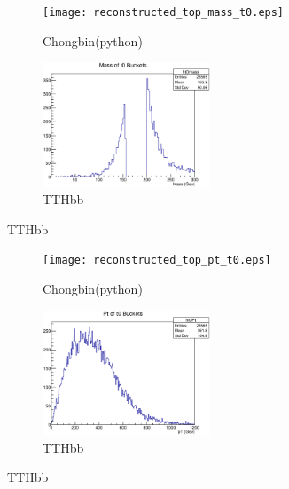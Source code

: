 \documentclass{beamer}
\begin{document}
\begin{frame}
  \begin{figure}[!h]
  \captionsetup[subfigure]{labelformat=empty}
  \begin{subfigure}{.5\textwidth}
  \centering
  \texttt{[image: reconstructed\_top\_mass\_t0.eps]}
  \caption{Chongbin(python)}
  \end{subfigure} \hfill
  \begin{subfigure}{.5\textwidth}
  \centering
  \includegraphics[width=5cm]{ht0mass_alljetregion.eps}
  \caption{TTHbb}
  \end{subfigure}
  \end{figure}
\end{frame}

\begin{frame}
  \begin{figure}[!h]
  \captionsetup[subfigure]{labelformat=empty}
  \begin{subfigure}{.5\textwidth}
  \centering
  \texttt{[image: reconstructed\_top\_pt\_t0.eps]}
  \caption{Chongbin(python)}
  \end{subfigure} \hfill
  \begin{subfigure}{.5\textwidth}
  \centering
  \includegraphics[width=5cm]{ht0Pt_alljetregion.eps}
  \caption{TTHbb}
  \end{subfigure}
  \end{figure}
\end{frame}
\end{document}

